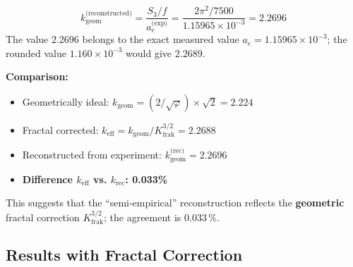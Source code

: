 	\begin{equation}
		k_{\text{geom}}^{\text{(reconstructed)}} = \frac{S_3/f}{a_e^{\text{(exp)}}} = \frac{2\pi^2 / 7500}{1.15965 \times 10^{-3}} = 2.2696
	\end{equation}
	The value $2.2696$ belongs to the exact measured value $a_e = 1.15965 \times 10^{-3}$; the rounded value $1.160 \times 10^{-3}$ would give $2.2689$.

	
	\textbf{Comparison:}
	\begin{itemize}
		\item Geometrically ideal: $k_{\text{geom}} = (2/\sqrt{\varphi}) \times \sqrt{2} = 2.224$
		\item Fractal corrected: $k_{\text{eff}} = k_{\text{geom}} / K_\text{frak}^{3/2} = 2.2688$
		\item Reconstructed from experiment: $k_{\text{geom}}^{\text{(rec)}} = 2.2696$
		\item \textbf{Difference $k_\text{eff}$ vs. $k_\text{rec}$: 0.033\%}
	\end{itemize}
	
	This suggests that the ``semi-empirical'' reconstruction reflects the \textbf{geometric} fractal correction $K_\text{frak}^{3/2}$; the agreement is $0.033\,\%$.
	
	\subsection{Results with Fractal Correction}
	
	\begin{table}[h]
		\centering
		\caption{Absolute values with geometric vs. fractal corrected $k_\text{eff}$}
	\end{table}
	
